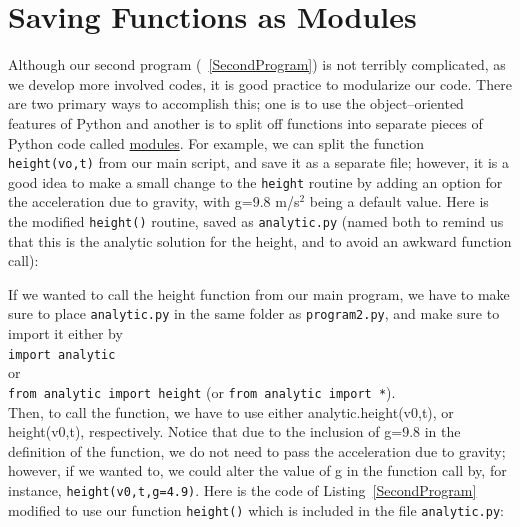 \section{Saving Functions as Modules}
\label{sec:Modules}
Although our second program (~\ref{SecondProgram}) is not terribly complicated, as we develop more involved codes, it is good practice to modularize our code. There are two primary ways to accomplish this; one is to use the object--oriented features of Python and another is to split off functions into separate pieces of Python code called \href{http://docs.python.org/tut/node8.html}{modules}. For example, we can split the function \verb!height(vo,t)! from our main script, and save it as a separate file; however, it is a good idea to make a small change to the \verb!height! routine by adding an option for the acceleration due to gravity, with g=9.8 m/s$^2$ being a default value. Here is the modified \verb!height()! routine, saved as \verb!analytic.py! (named both to remind us that this is the analytic solution for the height, and to avoid an awkward function call):
%

% 
If we wanted to call the height function from our main program, we have to make sure to place \verb!analytic.py! in the same folder as \verb!program2.py!, and make sure to import it either by \\
\verb!import analytic!\\
or \\
\verb!from analytic import height! (or \verb!from analytic import *!).\\
Then, to call the function, we have to use either analytic.height(v0,t), or height(v0,t), respectively. Notice that due to the inclusion of g=9.8 in the definition of the function, we do not need to pass the acceleration due to gravity; however, if we wanted to, we could alter the value of g in the function call by, for instance, \verb!height(v0,t,g=4.9)!. 
Here is the code of Listing~\ref{SecondProgram} modified to use our function \verb!height()! which is included in the file \verb!analytic.py!:
%

%
